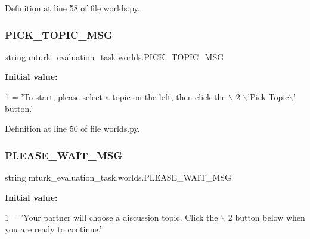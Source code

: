Definition at line 58 of file worlds.\+py.

\mbox{\label{namespacemturk__evaluation__task_1_1worlds_aa36a2954686056975c7648bf5a81bfca}} 
\subsubsection{\texorpdfstring{P\+I\+C\+K\+\_\+\+T\+O\+P\+I\+C\+\_\+\+M\+SG}{PICK\_TOPIC\_MSG}}
{\footnotesize\ttfamily string mturk\+\_\+evaluation\+\_\+task.\+worlds.\+P\+I\+C\+K\+\_\+\+T\+O\+P\+I\+C\+\_\+\+M\+SG}

{\bfseries Initial value\+:}
\begin{DoxyCode}
1 =  \textcolor{stringliteral}{'To start, please select a topic on the left, then click the \(\backslash\)}
2 \textcolor{stringliteral}{    \(\backslash\)'Pick Topic\(\backslash\)' button.'}
\end{DoxyCode}


Definition at line 50 of file worlds.\+py.

\mbox{\label{namespacemturk__evaluation__task_1_1worlds_a04cb02adc9f9bd549a7ac5eeccd96e90}} 
\subsubsection{\texorpdfstring{P\+L\+E\+A\+S\+E\+\_\+\+W\+A\+I\+T\+\_\+\+M\+SG}{PLEASE\_WAIT\_MSG}}
{\footnotesize\ttfamily string mturk\+\_\+evaluation\+\_\+task.\+worlds.\+P\+L\+E\+A\+S\+E\+\_\+\+W\+A\+I\+T\+\_\+\+M\+SG}

{\bfseries Initial value\+:}
\begin{DoxyCode}
1 =  \textcolor{stringliteral}{'Your partner will choose a discussion topic. Click the \(\backslash\)}
2 \textcolor{stringliteral}{    button below when you are ready to continue.'}
\end{DoxyCode}



